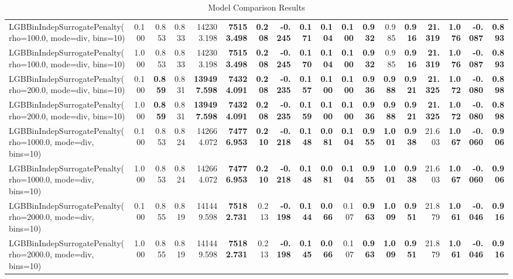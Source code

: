 \documentclass[11pt]{article}
\theoremstyle{plain}
\theoremstyle{definition}
\newcommand{\1}{\mathbf{1}}
\begin{document}
\begin{table}[htbp]
{\begin{tabular}{lrrrrrrrrrrrrrrrrr}
LGBBinIndepSurrogatePenalty(rho=100.0, mode=div, bins=10) & 0.100 & 0.853 & 0.833 & 142303.198 & \textbf{75153.498} & \textbf{0.208} & \textbf{-0.245} & \textbf{0.171} & \textbf{0.104} & \textbf{0.100} & \textbf{0.932} & 0.985 & \textbf{0.916} & \textbf{21.319} & \textbf{1.076} & \textbf{-0.087} & \textbf{0.893} \\
LGBBinIndepSurrogatePenalty(rho=100.0, mode=div, bins=10) & 1.000 & 0.853 & 0.833 & 142303.198 & \textbf{75153.498} & \textbf{0.208} & \textbf{-0.245} & \textbf{0.170} & \textbf{0.104} & \textbf{0.100} & \textbf{0.932} & 0.985 & \textbf{0.916} & \textbf{21.319} & \textbf{1.076} & \textbf{-0.087} & \textbf{0.893} \\
LGBBinIndepSurrogatePenalty(rho=200.0, mode=div, bins=10) & 0.100 & \textbf{0.859} & 0.831 & \textbf{139497.598} & \textbf{74324.091} & \textbf{0.208} & \textbf{-0.235} & \textbf{0.157} & \textbf{0.100} & \textbf{0.100} & \textbf{0.936} & \textbf{0.988} & \textbf{0.921} & \textbf{21.325} & \textbf{1.072} & \textbf{-0.080} & \textbf{0.898} \\
LGBBinIndepSurrogatePenalty(rho=200.0, mode=div, bins=10) & 1.000 & \textbf{0.859} & 0.831 & \textbf{139497.598} & \textbf{74324.091} & \textbf{0.208} & \textbf{-0.235} & \textbf{0.159} & \textbf{0.100} & \textbf{0.100} & \textbf{0.936} & \textbf{0.988} & \textbf{0.921} & \textbf{21.325} & \textbf{1.072} & \textbf{-0.080} & \textbf{0.898} \\
LGBBinIndepSurrogatePenalty(rho=1000.0, mode=div, bins=10) & 0.100 & 0.853 & 0.824 & 142664.072 & \textbf{74776.953} & \textbf{0.210} & \textbf{-0.218} & \textbf{0.148} & \textbf{0.081} & \textbf{0.104} & \textbf{0.955} & \textbf{1.001} & \textbf{0.938} & 21.603 & \textbf{1.067} & \textbf{-0.060} & \textbf{0.906} \\
LGBBinIndepSurrogatePenalty(rho=1000.0, mode=div, bins=10) & 1.000 & 0.853 & 0.824 & 142664.072 & \textbf{74776.953} & \textbf{0.210} & \textbf{-0.218} & \textbf{0.148} & \textbf{0.081} & \textbf{0.104} & \textbf{0.955} & \textbf{1.001} & \textbf{0.938} & 21.603 & \textbf{1.067} & \textbf{-0.060} & \textbf{0.906} \\
LGBBinIndepSurrogatePenalty(rho=2000.0, mode=div, bins=10) & 0.100 & 0.855 & 0.819 & 141449.598 & \textbf{75182.731} & 0.213 & \textbf{-0.198} & \textbf{0.144} & \textbf{0.066} & 0.107 & \textbf{0.963} & \textbf{1.009} & \textbf{0.951} & 21.879 & \textbf{1.061} & \textbf{-0.046} & \textbf{0.916} \\
LGBBinIndepSurrogatePenalty(rho=2000.0, mode=div, bins=10) & 1.000 & 0.855 & 0.819 & 141449.598 & \textbf{75182.731} & 0.213 & \textbf{-0.198} & \textbf{0.145} & \textbf{0.066} & 0.107 & \textbf{0.963} & \textbf{1.009} & \textbf{0.951} & 21.879 & \textbf{1.061} & \textbf{-0.046} & \textbf{0.916} \\
\bottomrule
\end{tabular}
     }
    \caption{Model Comparison Results}
    \label{tab:model_comparison}
\end{table}
\end{document}
